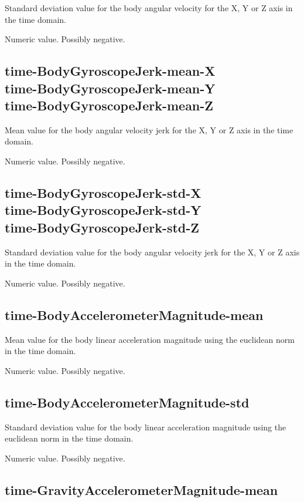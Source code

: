\documentclass[a4paper,10pt]{report}
\begin{document}
Standard deviation value for the body angular velocity for the X, Y or Z axis in the time domain.

Numeric value. Possibly negative.

\subsection*{time-BodyGyroscopeJerk-mean-X\\time-BodyGyroscopeJerk-mean-Y\\time-BodyGyroscopeJerk-mean-Z} 

Mean value for the body angular velocity jerk for the X, Y or Z axis in the time domain.

Numeric value. Possibly negative.

\subsection*{time-BodyGyroscopeJerk-std-X\\time-BodyGyroscopeJerk-std-Y\\time-BodyGyroscopeJerk-std-Z} 

Standard deviation value for the body angular velocity jerk for the X, Y or Z axis in the time domain.

Numeric value. Possibly negative.

\subsection*{time-BodyAccelerometerMagnitude-mean} 

Mean value for the body linear acceleration magnitude using the euclidean norm in the time domain.

Numeric value. Possibly negative.

\subsection*{time-BodyAccelerometerMagnitude-std} 

Standard deviation value for the body linear acceleration magnitude using the euclidean norm in the time domain.

Numeric value. Possibly negative.

\subsection*{time-GravityAccelerometerMagnitude-mean} 
\end{document}
